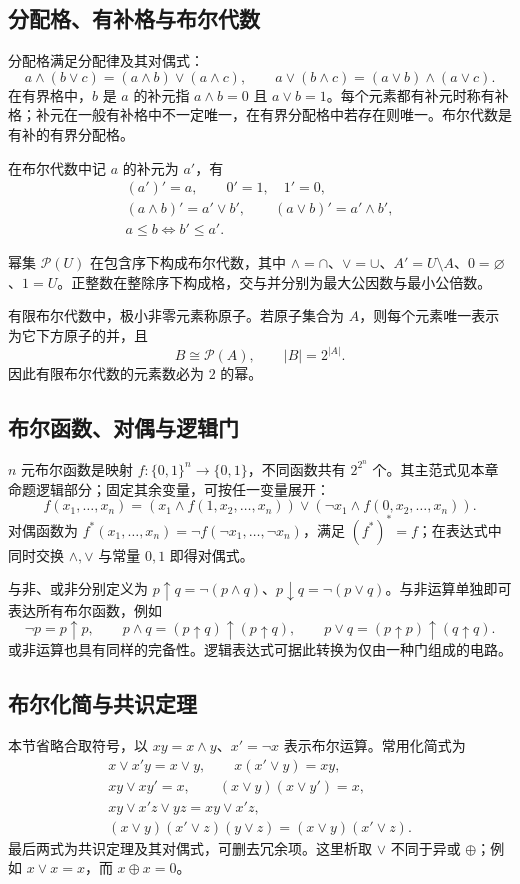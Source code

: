 \documentclass[../main.tex]{subfiles}
\begin{document}
\subsection{分配格、有补格与布尔代数}
分配格满足分配律及其对偶式：
\[
a\land(b\lor c)=(a\land b)\lor(a\land c),\qquad
a\lor(b\land c)=(a\lor b)\land(a\lor c).
\]
在有界格中，$b$ 是 $a$ 的补元指 $a\land b=0$ 且 $a\lor b=1$。每个元素都有补元时称有补格；补元在一般有补格中不一定唯一，在有界分配格中若存在则唯一。布尔代数是有补的有界分配格。

\begin{samepage}
在布尔代数中记 $a$ 的补元为 $a'$，有
\begin{gather*}
(a')'=a,\qquad 0'=1,\quad 1'=0,\\
(a\land b)'=a'\lor b',\qquad(a\lor b)'=a'\land b',\\
a\le b\iff b'\le a'.
\end{gather*}
\end{samepage}
幂集 $\mathcal P(U)$ 在包含序下构成布尔代数，其中 $\land=\cap$、$\lor=\cup$、$A'=U\setminus A$、$0=\varnothing$、$1=U$。正整数在整除序下构成格，交与并分别为最大公因数与最小公倍数。

有限布尔代数中，极小非零元素称原子。若原子集合为 $A$，则每个元素唯一表示为它下方原子的并，且
\[
B\cong\mathcal P(A),\qquad |B|=2^{|A|}.
\]
因此有限布尔代数的元素数必为 $2$ 的幂。

\subsection{布尔函数、对偶与逻辑门}
$n$ 元布尔函数是映射 $f:\{0,1\}^n\to\{0,1\}$，不同函数共有 $2^{2^n}$ 个。其主范式见本章命题逻辑部分；固定其余变量，可按任一变量展开：
\[
f(x_1,\ldots,x_n)
=(x_1\land f(1,x_2,\ldots,x_n))
\lor(\neg x_1\land f(0,x_2,\ldots,x_n)).
\]
对偶函数为 $f^*(x_1,\ldots,x_n)=\neg f(\neg x_1,\ldots,\neg x_n)$，满足 $(f^*)^*=f$；在表达式中同时交换 $\land,\lor$ 与常量 $0,1$ 即得对偶式。

与非、或非分别定义为 $p\uparrow q=\neg(p\land q)$、$p\downarrow q=\neg(p\lor q)$。与非运算单独即可表达所有布尔函数，例如
\[
\neg p=p\uparrow p,\qquad
p\land q=(p\uparrow q)\uparrow(p\uparrow q),\qquad
p\lor q=(p\uparrow p)\uparrow(q\uparrow q).
\]
或非运算也具有同样的完备性。逻辑表达式可据此转换为仅由一种门组成的电路。
\subsection{布尔化简与共识定理}
本节省略合取符号，以 $xy=x\land y$、$x'=\neg x$ 表示布尔运算。常用化简式为
\begin{gather*}
x\lor x'y=x\lor y,\qquad x(x'\lor y)=xy,\\
xy\lor xy'=x,\qquad (x\lor y)(x\lor y')=x,\\
xy\lor x'z\lor yz=xy\lor x'z,\\
(x\lor y)(x'\lor z)(y\lor z)=(x\lor y)(x'\lor z).
\end{gather*}
最后两式为共识定理及其对偶式，可删去冗余项。这里析取 $\lor$ 不同于异或 $\oplus$；例如 $x\lor x=x$，而 $x\oplus x=0$。
\end{document}
